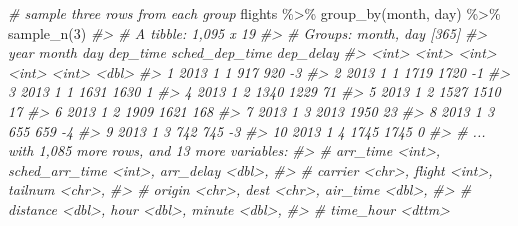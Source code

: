 \documentclass[
]{book}
\newenvironment{Shaded}{\begin{snugshade}}{\end{snugshade}}
\newcommand{\CommentTok}[1]{\textcolor[rgb]{0.56,0.35,0.01}{\textit{#1}}}
\newcommand{\DecValTok}[1]{\textcolor[rgb]{0.00,0.00,0.81}{#1}}
\newcommand{\FunctionTok}[1]{\textcolor[rgb]{0.00,0.00,0.00}{#1}}
\newcommand{\NormalTok}[1]{#1}
\newcommand{\SpecialCharTok}[1]{\textcolor[rgb]{0.00,0.00,0.00}{#1}}
\begin{document}
\begin{Shaded}
\begin{Highlighting}[]
\CommentTok{\# sample three rows from each group}
\NormalTok{flights }\SpecialCharTok{\%\textgreater{}\%} \FunctionTok{group\_by}\NormalTok{(month, day) }\SpecialCharTok{\%\textgreater{}\%} \FunctionTok{sample\_n}\NormalTok{(}\DecValTok{3}\NormalTok{)}
\CommentTok{\#\textgreater{} \# A tibble: 1,095 x 19}
\CommentTok{\#\textgreater{} \# Groups:   month, day [365]}
\CommentTok{\#\textgreater{}     year month   day dep\_time sched\_dep\_time dep\_delay}
\CommentTok{\#\textgreater{}    \textless{}int\textgreater{} \textless{}int\textgreater{} \textless{}int\textgreater{}    \textless{}int\textgreater{}          \textless{}int\textgreater{}     \textless{}dbl\textgreater{}}
\CommentTok{\#\textgreater{}  1  2013     1     1      917            920        {-}3}
\CommentTok{\#\textgreater{}  2  2013     1     1     1719           1720        {-}1}
\CommentTok{\#\textgreater{}  3  2013     1     1     1631           1630         1}
\CommentTok{\#\textgreater{}  4  2013     1     2     1340           1229        71}
\CommentTok{\#\textgreater{}  5  2013     1     2     1527           1510        17}
\CommentTok{\#\textgreater{}  6  2013     1     2     1909           1621       168}
\CommentTok{\#\textgreater{}  7  2013     1     3     2013           1950        23}
\CommentTok{\#\textgreater{}  8  2013     1     3      655            659        {-}4}
\CommentTok{\#\textgreater{}  9  2013     1     3      742            745        {-}3}
\CommentTok{\#\textgreater{} 10  2013     1     4     1745           1745         0}
\CommentTok{\#\textgreater{} \# ... with 1,085 more rows, and 13 more variables:}
\CommentTok{\#\textgreater{} \#   arr\_time \textless{}int\textgreater{}, sched\_arr\_time \textless{}int\textgreater{}, arr\_delay \textless{}dbl\textgreater{},}
\CommentTok{\#\textgreater{} \#   carrier \textless{}chr\textgreater{}, flight \textless{}int\textgreater{}, tailnum \textless{}chr\textgreater{},}
\CommentTok{\#\textgreater{} \#   origin \textless{}chr\textgreater{}, dest \textless{}chr\textgreater{}, air\_time \textless{}dbl\textgreater{},}
\CommentTok{\#\textgreater{} \#   distance \textless{}dbl\textgreater{}, hour \textless{}dbl\textgreater{}, minute \textless{}dbl\textgreater{},}
\CommentTok{\#\textgreater{} \#   time\_hour \textless{}dttm\textgreater{}}


\end{Highlighting}
\end{Shaded}
\end{document}
